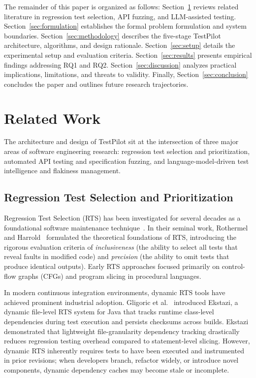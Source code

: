 \documentclass[12pt,onecolumn,draftclsnofoot]{IEEEtran}
\begin{document}
The remainder of this paper is organized as follows: Section~\ref{sec:related_work} reviews related literature in regression test selection, API fuzzing, and LLM-assisted testing. Section~\ref{sec:formulation} establishes the formal problem formulation and system boundaries. Section~\ref{sec:methodology} describes the five-stage TestPilot architecture, algorithms, and design rationale. Section~\ref{sec:setup} details the experimental setup and evaluation criteria. Section~\ref{sec:results} presents empirical findings addressing RQ1 and RQ2. Section~\ref{sec:discussion} analyzes practical implications, limitations, and threats to validity. Finally, Section~\ref{sec:conclusion} concludes the paper and outlines future research trajectories.

\section{Related Work}
\label{sec:related_work}

The architecture and design of TestPilot sit at the intersection of three major areas of software engineering research: regression test selection and prioritization, automated API testing and specification fuzzing, and language-model-driven test intelligence and flakiness management.

\subsection{Regression Test Selection and Prioritization}
Regression Test Selection (RTS) has been investigated for several decades as a foundational software maintenance technique~\cite{rothermel1996analyzing,yoo2012regression,engstrom2010systematic}. In their seminal work, Rothermel and Harrold~\cite{rothermel1996analyzing} formulated the theoretical foundations of RTS, introducing the rigorous evaluation criteria of \textit{inclusiveness} (the ability to select all tests that reveal faults in modified code) and \textit{precision} (the ability to omit tests that produce identical outputs). Early RTS approaches focused primarily on control-flow graphs (CFGs) and program slicing in procedural languages.

In modern continuous integration environments, dynamic RTS tools have achieved prominent industrial adoption. Gligoric et al.~\cite{gligoric2015practical} introduced Ekstazi, a dynamic file-level RTS system for Java that tracks runtime class-level dependencies during test execution and persists checksums across builds. Ekstazi demonstrated that lightweight file-granularity dependency tracking drastically reduces regression testing overhead compared to statement-level slicing. However, dynamic RTS inherently requires tests to have been executed and instrumented in prior revisions; when developers branch, refactor widely, or introduce novel components, dynamic dependency caches may become stale or incomplete.
\end{document}
